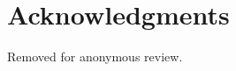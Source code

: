 \documentclass[chi_draft]{sigchi}
\begin{document}
\section{Acknowledgments}
Removed for anonymous review.


\newpage


\end{document}
